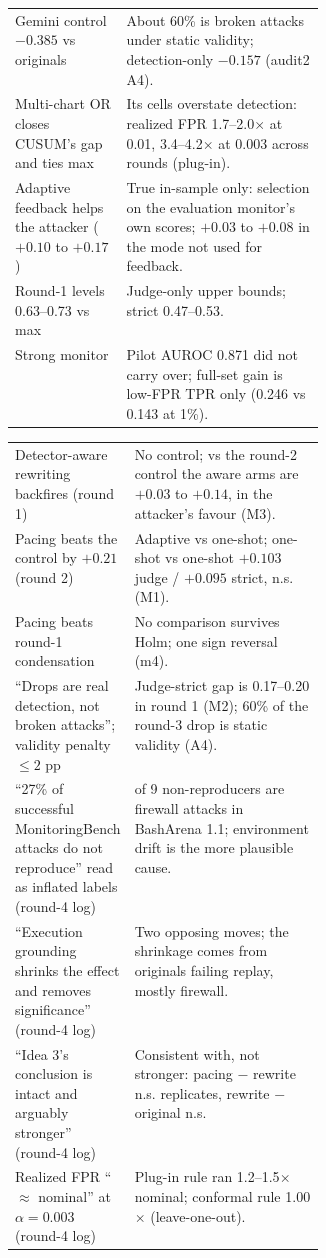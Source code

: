 \documentclass[11pt]{article}
\begin{document}
\begin{table}[H]
\begin{tabularx}{\linewidth}{@{}>{\raggedright\arraybackslash}p{0.36\linewidth}>{\raggedright\arraybackslash}X@{}}
Gemini control $-0.385$ vs originals & About 60\% is broken attacks under static validity; detection-only $-0.157$ (audit2 A4).\\
Multi-chart OR closes CUSUM's gap and ties max & Its cells overstate detection: realized FPR 1.7--2.0$\times$ at 0.01, 3.4--4.2$\times$ at 0.003 across rounds (plug-in).\\
Adaptive feedback helps the attacker ($+0.10$ to $+0.17$) & True in-sample only: selection on the evaluation monitor's own scores; $+0.03$ to $+0.08$ in the mode not used for feedback.\\
Round-1 levels 0.63--0.73 vs max & Judge-only upper bounds; strict 0.47--0.53.\\
Strong monitor & Pilot AUROC 0.871 did not carry over; full-set gain is low-FPR TPR only (0.246 vs 0.143 at 1\%).\\
\bottomrule
\end{tabularx}
\end{table}

\begin{table}[H]\centering\small
\begin{tabularx}{\linewidth}{@{}>{\raggedright\arraybackslash}p{0.36\linewidth}>{\raggedright\arraybackslash}X@{}}
\toprule
\multicolumn{2}{@{}l}{\textbf{Dropped}}\\
\midrule
Detector-aware rewriting backfires (round 1) & No control; vs the round-2 control the aware arms are $+0.03$ to $+0.14$, in the attacker's favour (M3).\\
Pacing beats the control by $+0.21$ (round 2) & Adaptive vs one-shot; one-shot vs one-shot $+0.103$ judge / $+0.095$ strict, n.s. (M1).\\
Pacing beats round-1 condensation & No comparison survives Holm; one sign reversal (m4).\\
``Drops are real detection, not broken attacks''; validity penalty $\le2$ pp & Judge-strict gap is 0.17--0.20 in round 1 (M2); 60\% of the round-3 drop is static validity (A4).\\
``27\% of successful MonitoringBench attacks do not reproduce'' read as inflated labels (round-4 log) & 8 of 9 non-reproducers are firewall attacks in BashArena 1.1; environment drift is the more plausible cause.\\
``Execution grounding shrinks the effect and removes significance'' (round-4 log) & Two opposing moves; the shrinkage comes from originals failing replay, mostly firewall.\\
``Idea 3's conclusion is intact and arguably stronger'' (round-4 log) & Consistent with, not stronger: pacing $-$ rewrite n.s. replicates, rewrite $-$ original n.s.\\
Realized FPR ``$\approx$ nominal'' at $\alpha=0.003$ (round-4 log) & Plug-in rule ran 1.2--1.5$\times$ nominal; conformal rule 1.00$\times$ (leave-one-out).\\
\bottomrule
\end{tabularx}
\end{table}
\end{document}
